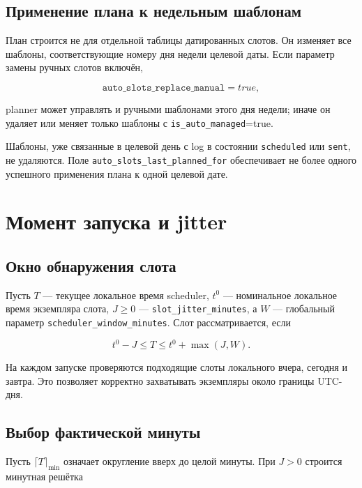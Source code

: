 \documentclass[12pt,a4paper]{article}
\newcommand{\Status}[1]{\texttt{#1}}
\newcommand{\Field}[1]{\texttt{#1}}
\begin{document}
\subsection{Применение плана к недельным шаблонам}

План строится не для отдельной таблицы датированных слотов. Он изменяет все
шаблоны, соответствующие номеру дня недели целевой даты. Если параметр замены
ручных слотов включён,

\begin{equation}
  \Field{auto\_slots\_replace\_manual}=true,
\end{equation}

planner может управлять и ручными шаблонами этого дня недели; иначе он удаляет
или меняет только шаблоны с \Field{is\_auto\_managed}=true.

Шаблоны, уже связанные в целевой день с log в состоянии \Status{scheduled} или
\Status{sent}, не удаляются. Поле
\Field{auto\_slots\_last\_planned\_for} обеспечивает не более одного
успешного применения плана к одной целевой дате.

\section{Момент запуска и jitter}

\subsection{Окно обнаружения слота}

Пусть $T$ --- текущее локальное время scheduler, $t^0$ --- номинальное локальное
время экземпляра слота, $J\geq0$ --- \Field{slot\_jitter\_minutes}, а $W$ ---
глобальный параметр \Field{scheduler\_window\_minutes}. Слот рассматривается,
если

\begin{equation}
  t^0-J\leq T\leq t^0+\max(J,W).
  \label{eq:due-window}
\end{equation}

На каждом запуске проверяются подходящие слоты локального вчера, сегодня и
завтра. Это позволяет корректно захватывать экземпляры около границы UTC-дня.

\subsection{Выбор фактической минуты}

Пусть $\lceil T\rceil_{\mathrm{min}}$ означает округление вверх до целой минуты.
При $J>0$ строится минутная решётка
\end{document}
